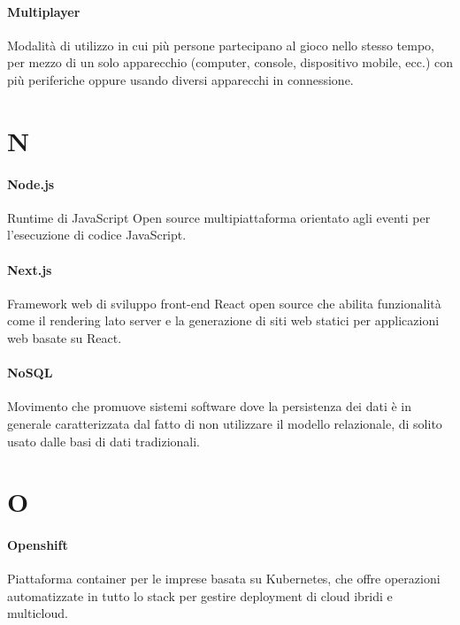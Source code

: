 \documentclass[]{article}
\begin{document}
	\paragraph*{Multiplayer}
	Modalità di utilizzo in cui più persone partecipano al gioco nello stesso tempo, per mezzo di un solo apparecchio (computer, console, dispositivo mobile, ecc.) con più periferiche oppure usando diversi apparecchi in connessione.
	
	\newpage
	
	\section*{N}
	
	\paragraph*{Node.js}
	Runtime di JavaScript Open source multipiattaforma orientato agli eventi per l'esecuzione di codice JavaScript.
	
	\paragraph*{Next.js}
	Framework web di sviluppo front-end React open source che abilita funzionalità come il rendering lato server e la generazione di siti web statici per applicazioni web basate su React.
	
	\paragraph*{NoSQL} 
	Movimento che promuove sistemi software dove la persistenza dei dati è in generale caratterizzata dal fatto di non utilizzare il modello relazionale, di solito usato dalle basi di dati tradizionali.
	
	\newpage
	
	\section*{O}
	
	\paragraph*{Openshift}
	Piattaforma container per le imprese basata su Kubernetes, che offre operazioni automatizzate in tutto lo stack per gestire deployment di cloud ibridi e multicloud.
	
\end{document}
